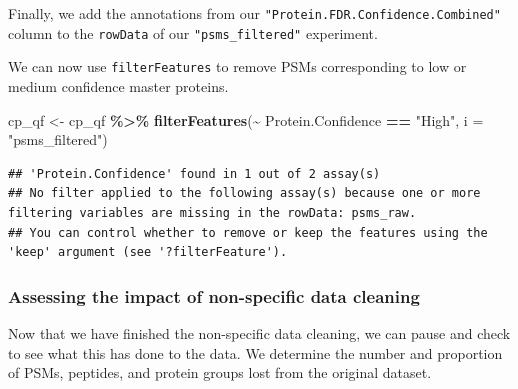 \documentclass[9pt,a4paper,]{extarticle}
\newenvironment{Shaded}{\begin{snugshade}}{\end{snugshade}}
\newcommand{\AttributeTok}[1]{\textcolor[rgb]{0.13,0.29,0.53}{#1}}
\newcommand{\FunctionTok}[1]{\textcolor[rgb]{0.13,0.29,0.53}{\textbf{#1}}}
\newcommand{\NormalTok}[1]{#1}
\newcommand{\OtherTok}[1]{\textcolor[rgb]{0.56,0.35,0.01}{#1}}
\newcommand{\SpecialCharTok}[1]{\textcolor[rgb]{0.81,0.36,0.00}{\textbf{#1}}}
\newcommand{\StringTok}[1]{\textcolor[rgb]{0.31,0.60,0.02}{#1}}
\begin{document}
Finally, we add the annotations from our \texttt{"Protein.FDR.Confidence.Combined"}
column to the \texttt{rowData} of our \texttt{"psms\_filtered"} experiment.

\begin{Shaded}
\end{Shaded}

We can now use \texttt{filterFeatures} to remove PSMs corresponding to low or medium
confidence master proteins.

\begin{Shaded}
\begin{Highlighting}[]
\NormalTok{cp\_qf }\OtherTok{\textless{}{-}}\NormalTok{ cp\_qf }\SpecialCharTok{\%\textgreater{}\%}
  \FunctionTok{filterFeatures}\NormalTok{(}\SpecialCharTok{\textasciitilde{}}\NormalTok{ Protein.Confidence }\SpecialCharTok{==} \StringTok{"High"}\NormalTok{, }\AttributeTok{i =} \StringTok{"psms\_filtered"}\NormalTok{)}
\end{Highlighting}
\end{Shaded}

\begin{verbatim}
## 'Protein.Confidence' found in 1 out of 2 assay(s)
## No filter applied to the following assay(s) because one or more filtering variables are missing in the rowData: psms_raw.
## You can control whether to remove or keep the features using the 'keep' argument (see '?filterFeature').
\end{verbatim}

\subsubsection{Assessing the impact of non-specific data cleaning}\label{assessing-the-impact-of-non-specific-data-cleaning}

Now that we have finished the non-specific data cleaning, we can pause and check
to see what this has done to the data. We determine the number and proportion of
PSMs, peptides, and protein groups lost from the original dataset.
\end{document}
